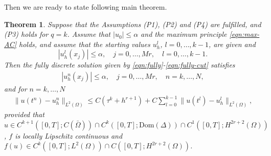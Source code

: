 \documentclass[a4paper, oneside]{book}
\def\II{(\Omega)}
\newtheorem{theorem}{Theorem}[section]
\begin{document}
Then we are ready to state following main theorem.

\begin{theorem}\label{thm:fully-error}
Suppose that the Assumptions (P1), (P2) and (P4) are fulfilled, and (P3) holds for $q=k$.
Assume that $|u_0|\le \alpha$ and the maximum principle \eqref{eqn:max-AC} holds,
 and assume that the starting values $u_h^l$, $l=0,\dots,k-1$, are given and
$$
|u_h^l(x_j)|\le \alpha , \quad j=0,\dots,Mr,\quad l=0,\dots,k-1.
$$
Then the   {fully discrete} solution given by \eqref{eqn:fully}-\eqref{eqn:fully-cut} satisfies
\begin{align*}%
|u_h^n(x_j)|\le \alpha , \quad j=0,\dots,Mr,\quad n=k,\dots,N,
\end{align*}
and  {for $n=k,\ldots,N$}
\begin{align*}%
  \| u(t^n) - u_h^n \|_{L^2(\Omega)} \le  C(\tau^k + h^{r+1}) + C\sum_{l=0}^{k-1}\| u(t^l) - u_h^l \|_{L^2(\Omega)} ,
\end{align*}
provided that {$u\in C^{k+1}([0,T];C(\bar \Omega)) \cap C^{k}([0,T];\text{Dom}(\Delta)) \cap C^1([0,T];H^{2r+2}(\Omega))$, $f$ is locally Lipschitz continuous and $f(u)\in C^k([0,T];L^2\II)\cap C([0,T];H^{2r+2}\II)$.}
\end{theorem}
\end{document}
